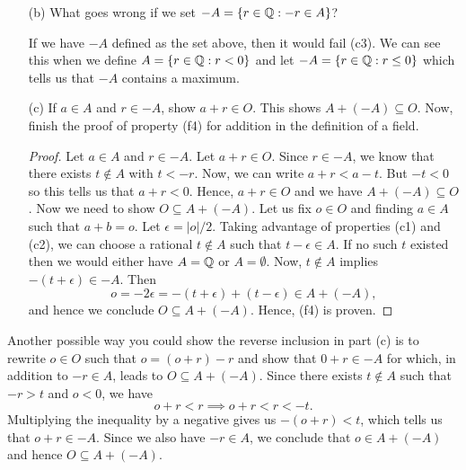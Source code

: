 \begin{enumerate}
\begin{proof}
        Finally, we show (c3). Suppose \( r \in -A  \). Then there exists \( t \notin A  \) such that \( -r > t  \). Multiplying through the inequality by a negative gives us \( r < -t  \) which is our desired result. Hence, \( -A  \) defines a cut.
        \end{proof}
    \item[(b)] What goes wrong if we set \( -A = \{ r \in \mathbb{Q} : -r \in A  \}  \)?
        \begin{explanation}
        If we have \( -A  \) defined as the set above, then it would fail (c3). We can see this when we define \(  A = \{ r \in \mathbb{Q} : r < 0  \}  \) and let \( -A = \{ r \in \mathbb{Q} : r \leq  0 \}   \) which tells us that \( -A  \) contains a maximum.
        \end{explanation}
    \item[(c)] If \( a \in A  \) and \( r \in -A  \), show \( a + r \in O  \). This shows \( A + (-A ) \subseteq O  \). Now, finish the proof of property (f4) for addition in the definition of a field.
        \begin{proof}
            Let \( a \in A  \) and \( r \in -A  \). Let \( a + r \in O  \). Since \( r \in -A  \), we know that there exists \( t \notin A  \) with \( t < -r  \). Now, we can write \( a + r < a - t    \). But \( -t < 0  \) so this tells us that \( a + r < 0  \). Hence, \( a + r \in O  \) and we have \( A + (-A) \subseteq O  \). Now we need to show \( O \subseteq A + (-A)  \). Let us fix \( o \in O  \) and finding \( a \in A  \) such that \( a + b = o  \). Let \( \epsilon  = | o | / 2  \). Taking advantage of properties (c1) and (c2), we can choose a rational \( t \notin A  \) such that \( t - \epsilon \in A  \). If no such \( t  \) existed then we would either have \( A = \mathbb{Q}  \) or \( A = \emptyset \). Now, \( t \notin A   \) implies \( -(t+\epsilon ) \in -A  \). Then 
            \[ o = -2 \epsilon = -(t+\epsilon ) + (t-\epsilon ) \in A + (-A ), \] and hence we conclude \( O \subseteq A + (-A) \). Hence, (f4) is proven.
        \end{proof}
\end{enumerate}

\begin{remark}
   Another possible way you could show the reverse inclusion in part (c) is to rewrite \( o \in O  \) such that \( o = (o+r) - r  \) and show that \( 0+r  \in -A \) for which, in addition to \( -r \in A  \), leads to \( O \subseteq A + (-A ) \). Since there exists \( t \notin A  \) such that \( -r > t  \) and \( o < 0  \), we have 
   \[  o+r < r \implies o + r < r < -t.   \]
   Multiplying the inequality by a negative gives us \( -(o+r) < t  \), which tells us that \( o +r \in -A  \). Since we also have \( - r \in A   \), we conclude that \( o \in A + (-A )  \) and hence \( O \subseteq A + (-A) \).
\end{remark}

